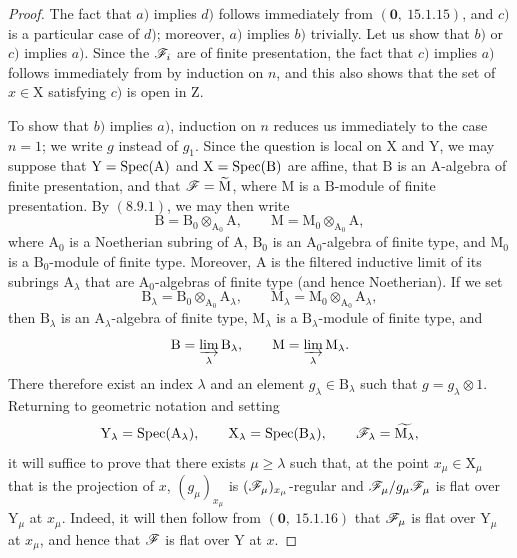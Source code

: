 \begin{proof}
The fact that $a)$ implies $d)$ follows immediately from $(\mathbf{0},~15.1.15)$, and $c)$ is a particular case of $d)$; moreover, $a)$ implies $b)$ trivially. Let us show that $b)$ or $c)$ implies $a)$. Since the $\mathscr{F}_i$ are of finite presentation, the fact that $c)$ implies $a)$ follows immediately from  by induction on $n$, and this also shows that the set of $x\in\mathrm{X}$ satisfying $c)$ is open in $\mathrm{Z}$.

To show that $b)$ implies $a)$, induction on $n$ reduces us immediately to the case $n=1$; we write $g$ instead of $g_1$. Since the question is local on $\mathrm{X}$ and $\mathrm{Y}$, we may suppose that $\mathrm{Y}=\operatorname{Spec}(\mathrm{A})$ and $\mathrm{X}=\operatorname{Spec}(\mathrm{B})$ are affine, that $\mathrm{B}$ is an $\mathrm{A}$-algebra of finite presentation, and that $\mathscr{F}=\widetilde{\mathrm{M}}$, where $\mathrm{M}$ is a $\mathrm{B}$-module of finite presentation. By $(8.9.1)$, we may then write
\[
  \mathrm{B}=\mathrm{B}_0\otimes_{\mathrm{A}_0}\mathrm{A},
  \qquad
  \mathrm{M}=\mathrm{M}_0\otimes_{\mathrm{A}_0}\mathrm{A},
\]
where $\mathrm{A}_0$ is a Noetherian subring of $\mathrm{A}$, $\mathrm{B}_0$ is an $\mathrm{A}_0$-algebra of finite type, and $\mathrm{M}_0$ is a $\mathrm{B}_0$-module of finite type. Moreover, $\mathrm{A}$ is the filtered inductive limit of its subrings $\mathrm{A}_\lambda$ that are $\mathrm{A}_0$-algebras of finite type (and hence Noetherian). If we set
\[
  \mathrm{B}_\lambda=\mathrm{B}_0\otimes_{\mathrm{A}_0}\mathrm{A}_\lambda,
  \qquad
  \mathrm{M}_\lambda=\mathrm{M}_0\otimes_{\mathrm{A}_0}\mathrm{A}_\lambda,
\]
then $\mathrm{B}_\lambda$ is an $\mathrm{A}_\lambda$-algebra of finite type, $\mathrm{M}_\lambda$ is a $\mathrm{B}_\lambda$-module of finite type, and
\[
  \mathrm{B}=\varinjlim_\lambda\mathrm{B}_\lambda,
  \qquad
  \mathrm{M}=\varinjlim_\lambda\mathrm{M}_\lambda.
\]
There therefore exist an index $\lambda$ and an element $g_\lambda\in\mathrm{B}_\lambda$ such that $g=g_\lambda\otimes 1$. Returning to geometric notation and setting
\[
  \mathrm{Y}_\lambda=\operatorname{Spec}(\mathrm{A}_\lambda),
  \qquad
  \mathrm{X}_\lambda=\operatorname{Spec}(\mathrm{B}_\lambda),
  \qquad
  \mathscr{F}_\lambda=\widetilde{\mathrm{M}_\lambda},
\]
it will suffice to prove that there exists $\mu\geqslant\lambda$ such that, at the point $x_\mu\in\mathrm{X}_\mu$ that is the projection of $x$, $(g_\mu)_{x_\mu}$ is $(\mathscr{F}_\mu)_{x_\mu}$-regular and $\mathscr{F}_\mu/g_\mu\mathscr{F}_\mu$ is flat over $\mathrm{Y}_\mu$ at $x_\mu$. Indeed, it will then follow from $(\mathbf{0},~15.1.16)$ that $\mathscr{F}_\mu$ is flat over $\mathrm{Y}_\mu$ at $x_\mu$, and hence that $\mathscr{F}$ is flat over $\mathrm{Y}$ at $x$.


\end{proof}
